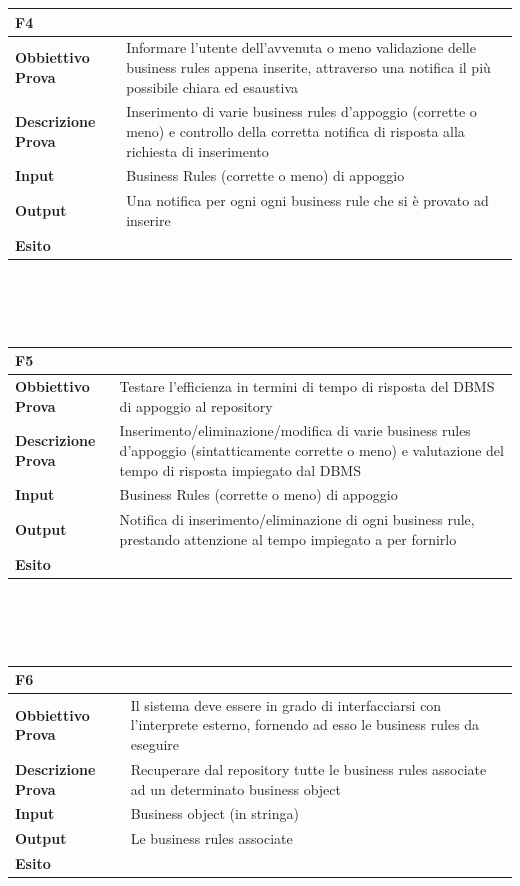 \documentclass[11pt,titlepage,a4paper]{report}
\begin{document}
\begin{tabular}{||p{4.5cm}||p{7.5cm}||}
\hline
\textbf{\textsf{F4}}& \\
\hline
{\textbf {Obbiettivo Prova}}& Informare l'utente dell'avvenuta o meno validazione delle business rules appena inserite, attraverso una notifica il pi\`u possibile chiara ed esaustiva\\ \hline
{\textbf{Descrizione Prova}}& Inserimento di varie business rules d'appoggio (corrette o meno) e controllo della corretta notifica di risposta alla richiesta di inserimento \\ \hline
{\textbf{Input}}& Business Rules (corrette o meno) di appoggio  \\ \hline
{\textbf{Output}}& Una notifica per ogni ogni business rule che si \`e provato ad inserire \\ \hline
{\textbf{Esito}}&  \\ \hline
\end{tabular} \\
\\
\\
\begin{tabular}{||p{4.5cm}||p{7.5cm}||}
\hline
\textbf{\textsf{F5}}& \\
\hline
{\textbf {Obbiettivo Prova}}& Testare l'efficienza in termini di tempo di risposta del DBMS di appoggio al repository\\ \hline
{\textbf{Descrizione Prova}}& Inserimento/eliminazione/modifica di varie business rules d'appoggio (sintatticamente corrette o meno) e valutazione del tempo di risposta impiegato dal DBMS \\ \hline
{\textbf{Input}}& Business Rules (corrette o meno) di appoggio  \\ \hline
{\textbf{Output}}& Notifica di inserimento/eliminazione di ogni business rule, prestando attenzione al tempo impiegato a per fornirlo \\ \hline
{\textbf{Esito}}&  \\ \hline
\end{tabular} \\
\\
\\
\begin{tabular}{||p{4.5cm}||p{7.5cm}||}
\hline
\textbf{\textsf{F6}}& \\
\hline
{\textbf {Obbiettivo Prova}}& Il sistema deve essere in grado di interfacciarsi con l'interprete esterno, fornendo ad esso le business rules da eseguire\\ \hline
{\textbf{Descrizione Prova}}&  Recuperare dal repository tutte le business rules associate ad un determinato business object\\ \hline
{\textbf{Input}}&  Business object (in stringa) \\ \hline
{\textbf{Output}}& Le business rules associate\\ \hline
{\textbf{Esito}}&  \\ \hline
\end{tabular} \\
\end{document}
